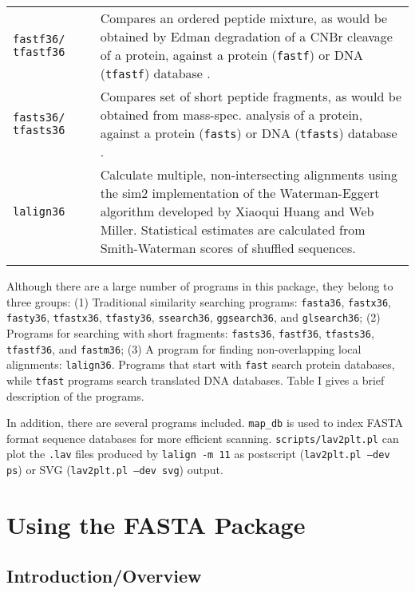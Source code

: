 \documentclass[11pt]{article}
\begin{document}
\begin{table}
\begin{tabular}{ p{0.8in} p{0.6in} p{4.6 in}}
\texttt{fastf36/ tfastf36} &  &
Compares an ordered peptide mixture, as would be obtained by
Edman degradation of a CNBr cleavage of a protein, against a protein
(\texttt{fastf}) or DNA (\texttt{tfastf}) database \cite{wrp021}.\\[1 ex]

\texttt{fasts36/ tfasts36} &  &
Compares set of short peptide fragments, as would be obtained
from mass-spec. analysis of a protein, against a
protein (\texttt{fasts}) or DNA (\texttt{tfasts}) database \cite{wrp021}.\\[1 ex]

\texttt{lalign36} & & Calculate multiple, non-intersecting alignments
using the sim2 implementation of the Waterman-Eggert
algorithm\cite{wat875} developed by Xiaoqui Huang and Web
Miller\cite{mil908}.  Statistical estimates are calculated from
Smith-Waterman scores of shuffled sequences. \\[1 ex]

\hline \\
\end{tabular}
\end{table}

Although there are a large number of programs in this package, they
belong to three groups: (1) Traditional similarity searching programs:
\texttt{fasta36}, \texttt{fastx36}, \texttt{fasty36},
\texttt{tfastx36}, \texttt{tfasty36}, \texttt{ssearch36},
\texttt{ggsearch36}, and \texttt{glsearch36}; (2) Programs for
searching with short fragments: \texttt{fasts36}, \texttt{fastf36},
\texttt{tfasts36}, \texttt{tfastf36}, and \texttt{fastm36}; (3) A
program for finding non-overlapping local alignments: \texttt{lalign36}.
Programs that start with \texttt{fast} search protein databases, while
\texttt{tfast} programs search translated DNA databases.  Table I
gives a brief description of the programs.

In addition, there are several programs included. \texttt{map\_db} is
used to index FASTA format sequence databases for more efficient
scanning. \texttt{scripts/lav2plt.pl} can plot the \texttt{.lav}
files produced by \texttt{lalign -m 11} as postscript
(\texttt{lav2plt.pl --dev ps}) or SVG (\texttt{lav2plt.pl --dev svg}) output.

\section{Using the FASTA Package}
\subsection{Introduction/Overview}
\end{document}
